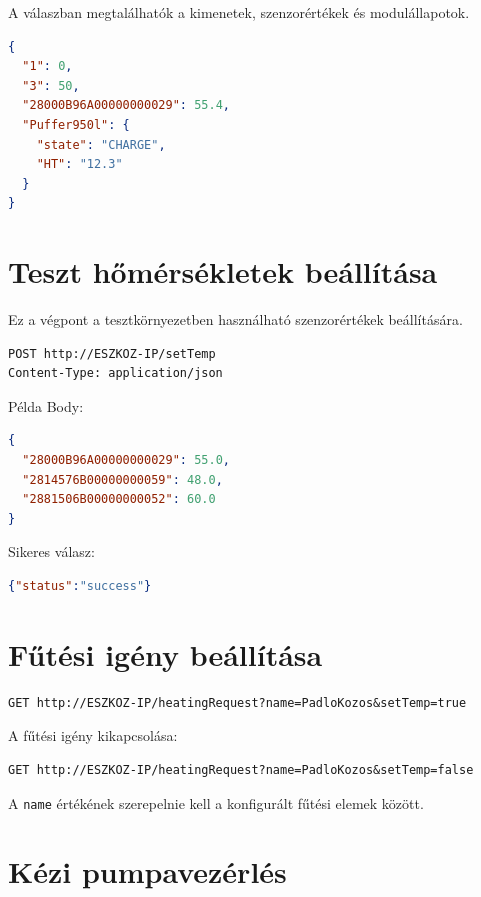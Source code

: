 \documentclass[11pt,a4paper]{article}
\begin{document}
A válaszban megtalálhatók a kimenetek, szenzorértékek és modulállapotok.

\begin{lstlisting}[language=json]
{
  "1": 0,
  "3": 50,
  "28000B96A00000000029": 55.4,
  "Puffer950l": {
    "state": "CHARGE",
    "HT": "12.3"
  }
}
\end{lstlisting}

\section{Teszt hőmérsékletek beállítása}

Ez a végpont a tesztkörnyezetben használható szenzorértékek beállítására.

\begin{lstlisting}
POST http://ESZKOZ-IP/setTemp
Content-Type: application/json
\end{lstlisting}

Példa Body:

\begin{lstlisting}[language=json]
{
  "28000B96A00000000029": 55.0,
  "2814576B00000000059": 48.0,
  "2881506B00000000052": 60.0
}
\end{lstlisting}

Sikeres válasz:

\begin{lstlisting}[language=json]
{"status":"success"}
\end{lstlisting}

\section{Fűtési igény beállítása}

\begin{lstlisting}
GET http://ESZKOZ-IP/heatingRequest?name=PadloKozos&setTemp=true
\end{lstlisting}

A fűtési igény kikapcsolása:

\begin{lstlisting}
GET http://ESZKOZ-IP/heatingRequest?name=PadloKozos&setTemp=false
\end{lstlisting}

A \texttt{name} értékének szerepelnie kell a konfigurált fűtési elemek között.

\section{Kézi pumpavezérlés}
\end{document}
